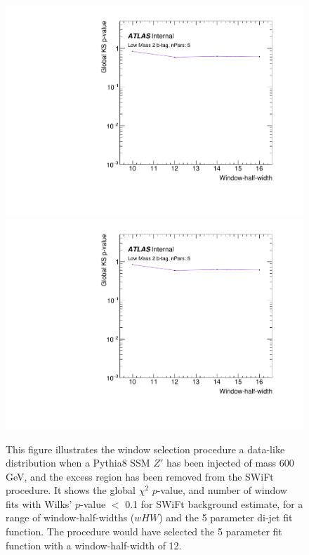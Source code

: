 \begin{figure}[!htb]
\captionsetup[subfigure]{aboveskip=0pt,justification=centering}
\centering
{} {
  \includegraphics[width=0.49\linewidth, angle=0,page=2]{figs/Dibjet/LowMass/FitStudy/windowSel_corrFitCR_dataLike_v11_Zprimebb600_xsFactor1_removeWindow.pdf}
}\hspace{-8mm}
 {
  \includegraphics[width=0.49\linewidth, angle=0,page=4]{figs/Dibjet/LowMass/FitStudy/windowSel_corrFitCR_dataLike_v11_Zprimebb600_xsFactor1_removeWindow.pdf}
}
\vspace{10pt}
\caption{\label{fig:windowSel_Zprimebb600_xsFactor1}
  This figure illustrates the window selection procedure a data-like distribution when
  a Pythia8 SSM $Z'$ has been injected of mass 600 GeV, and the excess region has been removed from the SWiFt procedure.
  It shows the global $\chi^{2}$ $p$-value, %
  and number of window fits with Wilks' $p$-value $<$ 0.1 for SWiFt background estimate,
  for a range of window-half-widths ($wHW$) and the 5 parameter di-jet fit function.
  The procedure would have selected the 5 parameter fit function with a window-half-width of 12.
}
\end{figure}

